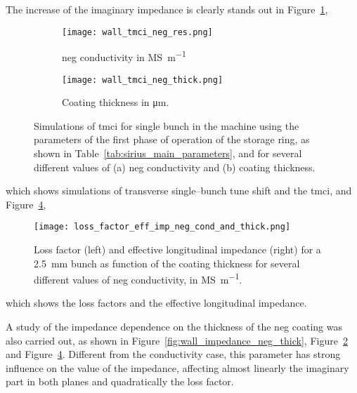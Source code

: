     The increase of the imaginary impedance is clearly stands out in Figure~\ref{fig:wall_tmci_neg_res},
    \begin{figure}
        \centering
        \begin{subfigure}[c]{0.49\textwidth}
            \texttt{[image: wall\_tmci\_neg\_res.png]}
            \caption{\gls{neg} conductivity in \si{\mega\siemens\per\meter}}
            \label{fig:wall_tmci_neg_res}
            \end{subfigure}\hfill
            \begin{subfigure}[c]{0.49\textwidth}
                \texttt{[image: wall\_tmci\_neg\_thick.png]}
                \caption{Coating thickness in \si{\micro\meter}.}
                \label{fig:wall_tmci_neg_thick}
            \end{subfigure}
            \caption[Effect of NEG on TMCI]{Simulations of \gls{tmci} for single bunch in the machine using the parameters of the first phase of operation of the storage ring, as shown in Table~\ref{tab:sirius_main_parameters}, and for several different values of (a) \gls{neg} conductivity and (b) coating thickness.}
            \label{fig:wall_tmci_neg}
        \end{figure}
    which shows simulations of transverse single--bunch tune shift and the \gls{tmci}, and Figure~\ref{fig:wall_loss_facttor_eff_imp_cond_thick},
    \begin{figure}
        \centering
        \texttt{[image: loss\_factor\_eff\_imp\_neg\_cond\_and\_thick.png]}
        \caption[Effect of NEG on loss factor and effective longitudinal impedance]{Loss factor (left) and effective longitudinal impedance (right) for a \SI{2.5}{\milli\meter} bunch as function of the coating thickness for several different values of \gls{neg} conductivity, in \si{\mega\siemens\per\meter}.}
        \label{fig:wall_loss_facttor_eff_imp_cond_thick}
    \end{figure}
    which shows the loss factors and the effective longitudinal impedance.

    A study of the impedance dependence on the thickness of the \gls{neg} coating was also carried out, as shown in Figure~\ref{fig:wall_impedance_neg_thick}, Figure~\ref{fig:wall_tmci_neg_thick} and Figure~\ref{fig:wall_loss_facttor_eff_imp_cond_thick}. Different from the conductivity case, this parameter has strong influence on the value of the impedance, affecting almost linearly the imaginary part in both planes and quadratically the loss factor.

